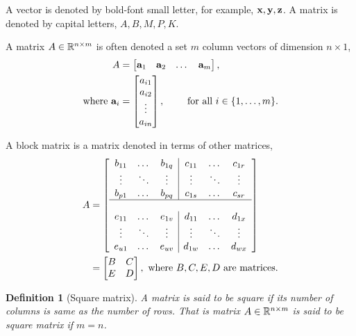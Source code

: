 \documentclass[twocolumn]{article}
\newtheorem{defn}{Definition}
\begin{document}
A vector is denoted by bold-font small letter, for example, $\mathbf{x}, \mathbf{y}, \mathbf{z}$.
A  matrix is denoted by capital letters, $A, B, M, P, K$.

A matrix $A  \in \mathbb{R}^{n \times  m}$ is often denoted a set $m$ column vectors
of dimension $n   \times  1$,
%
\begin{align}
  A  &=  \begin{bmatrix}
    \mathbf{a}_1 &  \mathbf{a}_2 &  \dots & \mathbf{a}_m
  \end{bmatrix},
 \notag\\
 \text{where   }   \mathbf{a}_i &= \begin{bmatrix}
 a_{i1} \\  a_{i2} \\ \vdots \\ a_{in}
 \end{bmatrix}, \qquad  \text{ for all } i  \in \{1, \dots, m\}.
\end{align}
%

A block matrix  is a matrix denoted in terms  of  other matrices,
%
\begin{align}
  A &= \left[\begin{array}{ccc|ccc}
        b_{11} & \dots  &   b_{1q}  &   c_{11}  &   \dots   & c_{1r} \\
        \vdots  &  \ddots   & \vdots &  \vdots  &  \ddots  &  \vdots  \\
        b_{p1} & \dots  &   b_{pq}  &   c_{1s}  &   \dots   & c_{sr} \\
        \cline{1-6}  \\
        e_{11} & \dots  &   e_{1v}  &   d_{11}  &   \dots   & d_{1x} \\
        \vdots  &  \ddots   & \vdots &  \vdots  &  \ddots  &  \vdots  \\
        e_{u1} & \dots  &   e_{uv}  &   d_{1w}  &   \dots   & d_{wx} \\
            \end{array}\right]
  \\
    &= \begin{bmatrix}
        B  &   C \\
        E & D
        \end{bmatrix}, \text{  where  }  B, C, E, D \text{ are matrices.}
\end{align}
%

\begin{defn}[Square matrix]
  A matrix is said to be square if its number of columns is same as the number
  of rows. That is matrix   $A \in \mathbb{R}^{n \times m}$ is said to be square
  matrix if $m = n$.
\end{defn}
\end{document}

